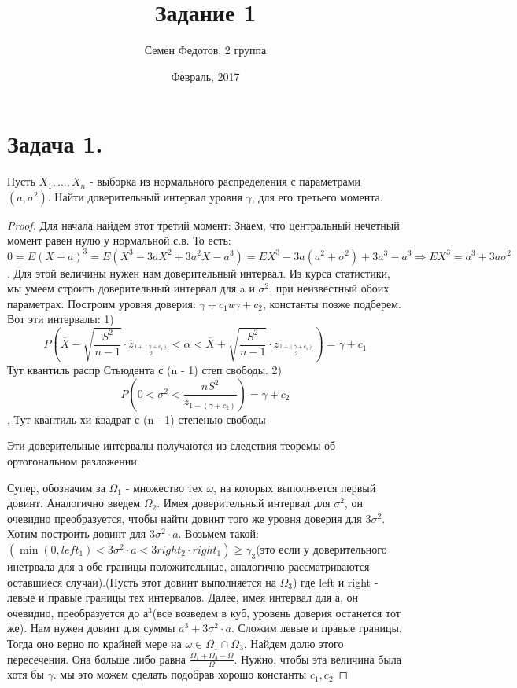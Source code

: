 \documentclass{article}
\title{Задание 1}
\author{Семен Федотов, 2 группа}
\date{Февраль, 2017}
\theoremstyle{plain}
\theoremstyle{definition}
\begin{document}
	\maketitle
	
\section{Задача 1.}
 Пусть $X_1, \dots , X_n$ -  выборка из нормального распределения с параметрами $(a, \sigma^2)$. Найти доверительный интервал уровня $\gamma$, для его третьего момента.
\begin{proof}
	Для начала найдем этот третий момент:
	Знаем, что центральный нечетный момент равен нулю у нормальной с.в. То есть: $0 = E(X - a)^3 = E(X^3 - 3aX^2 + 3a^2X - a^3) = EX^3 - 3a(a^2 + \sigma^2) + 3a^3 - a^3 \Rightarrow EX^3 = a^3 + 3a\sigma^2$. Для этой величины нужен нам доверительный интервал. Из курса статистики, мы умеем строить доверительный интервал для a и $\sigma^2$, при неизвестный обоих параметрах. Построим уровня доверия: $\gamma + c_1 u \gamma + c_2$, константы позже подберем. Вот эти интервалы:
	1) $$P(\overline{X} - \sqrt{\frac{S^2}{n - 1}} \cdot z_{\frac{1 + (\gamma + c_1)}{2}} < \alpha < \overline{X} + \sqrt{\frac{S^2}{n - 1}} \cdot z_{\frac{1 + (\gamma + c_1)}{2}}) = \gamma + c_1$$ Тут квантиль распр Стьюдента с (n - 1) степ свободы.
	2) $$P(0 < \sigma^2 < \frac{nS^2}{z_{1 - (\gamma + c_2)}}) = \gamma + c_2$$, Тут квантиль хи квадрат с (n - 1) степенью свободы
	
	Эти доверительные интервалы получаются из следствия теоремы об ортогональном разложении.
	
	Супер, обозначим за $\Omega_1 $ - множество тех $\omega$, на которых выполняется первый довинт. Аналогично введем $\Omega_2$.
	Имея доверительный интервал для $\sigma^2$, он очевидно преобразуется, чтобы найти довинт того же уровня доверия для $3\sigma^2$. Хотим построить довинт для $3\sigma^2 \cdot a$.
	Возьмем такой:$(\min{(0, left_1)} < 3\sigma^2 \cdot a < 3right_2 \cdot right_1) \geq \gamma_3$(это если у доверительного инетрвала для а обе границы положительные, аналогично рассматриваются оставшиеся случаи).(Пусть этот довинт выполняется на $\Omega_3$) где left и right - левые и правые границы тех интервалов. Далее, имея интервал для а, он очевидно, преобразуется до $а^3$(все возведем в куб, уровень доверия останется тот же). Нам нужен довинт для суммы  $a^3 + 3\sigma^2 \cdot a$. Сложим левые и правые границы. Тогда оно верно по крайней мере на $\omega \in \Omega_1 \cap \Omega_3$. Найдем долю этого пересечения. Она больше либо равна $\frac{\Omega_1 + \Omega_3 - \Omega}{\Omega}$. Нужно, чтобы эта величина была хотя бы $\gamma$. мы это можем сделать подобрав хорошо константы $c_1, c_2$
\end{proof}	
	
\end{document}
